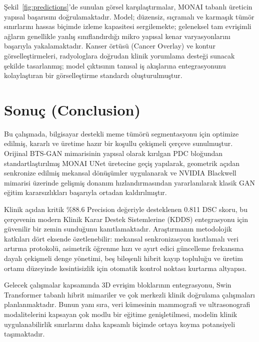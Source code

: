 \documentclass[10pt,journal,compsoc]{IEEEtran}
\begin{document}
Şekil~\ref{fig:predictions}'de sunulan görsel karşılaştırmalar, MONAI tabanlı üreticin yapısal başarısını doğrulamaktadır. Model; düzensiz, sıçramalı ve karmaşık tümör sınırlarını hassas biçimde izleme kapasitesi sergilemekte; geleneksel tam evrişimli ağların genellikle yanlış sınıflandırdığı mikro yapısal kenar varyasyonlarını başarıyla yakalamaktadır. Kanser örtüsü (Cancer Overlay) ve kontur görselleştirmeleri, radyologlara doğrudan klinik yorumlama desteği sunacak şekilde tasarlanmış; model çıktısının tanısal iş akışlarına entegrasyonunu kolaylaştıran bir görselleştirme standardı oluşturulmuştur.

\section{Sonuç \textnormal{\small{(Conclusion)}}}

Bu çalışmada, bilgisayar destekli meme tümörü segmentasyonu için optimize edilmiş, kararlı ve üretime hazır bir koşullu çekişmeli çerçeve sunulmuştur. Orijinal BTS-GAN mimarisinin yapısal olarak kırılgan PDC bloğundan standartlaştırılmış MONAI UNet üretecine geçiş yapılarak, geometrik açıdan senkronize edilmiş mekansal dönüşümler uygulanarak ve NVIDIA Blackwell mimarisi üzerinde gelişmiş donanım hızlandırmasından yararlanılarak klasik GAN eğitim kararsızlıkları başarıyla ortadan kaldırılmıştır.

Klinik açıdan kritik \%88.6 Precision değeriyle desteklenen 0.811 DSC skoru, bu çerçevenin modern Klinik Karar Destek Sistemlerine (KDDS) entegrasyonu için güvenilir bir zemin sunduğunu kanıtlamaktadır. Araştırmanın metodolojik katkıları dört eksende özetlenebilir: mekansal senkronizasyon kısıtlamalı veri artırma protokolü, asimetrik öğrenme hızı ve ayırt edici güncelleme frekansına dayalı çekişmeli denge yönetimi, beş bileşenli hibrit kayıp topluluğu ve üretim ortamı düzeyinde kesintisizlik için otomatik kontrol noktası kurtarma altyapısı.

Gelecek çalışmalar kapsamında 3D evrişim bloklarının entegrasyonu, Swin Transformer tabanlı hibrit mimariler ve çok merkezli klinik doğrulama çalışmaları planlanmaktadır. Bunun yanı sıra, veri kümesinin mammografi ve ultrasonografi modalitelerini kapsayan çok modlu bir eğitime genişletilmesi, modelin klinik uygulanabilirlik sınırlarını daha kapsamlı biçimde ortaya koyma potansiyeli taşımaktadır.
\end{document}
